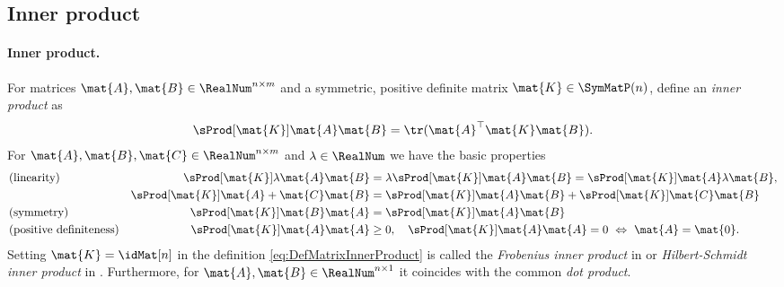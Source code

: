 \subsection{Inner product}\label{sec:MathInnerProduct}
\paragraph{Inner product.}
For matrices $\mat{A}, \mat{B} \in \RealNum^{n\times m}$ and a symmetric, positive definite matrix $ \mat{K} \in \SymMatP(n)$, define an \textit{inner product} as
\begin{align}\label{eq:DefMatrixInnerProduct}
 \sProd[\mat{K}]{\mat{A}}{\mat{B}} = \tr(\mat{A}^\top \mat{K} \mat{B}).
\end{align}
For $\mat{A}, \mat{B}, \mat{C} \in \RealNum^{n\times m}$ and $\lambda \in \RealNum$ we have the basic properties
\begin{subequations}
\begin{align}
 &\text{(linearity)}&
 \sProd[\mat{K}]{\lambda \mat{A}}{\mat{B}} &= \lambda \sProd[\mat{K}]{\mat{A}}{\mat{B}} = \sProd[\mat{K}]{\mat{A}}{\lambda \mat{B}},
\\
 &&
 \sProd[\mat{K}]{\mat{A}+\mat{C}}{\mat{B}} &= \sProd[\mat{K}]{\mat{A}}{\mat{B}} + \sProd[\mat{K}]{\mat{C}}{\mat{B}}
\\
 &\text{(symmetry)}&
 \sProd[\mat{K}]{\mat{B}}{\mat{A}} %
 &= \sProd[\mat{K}]{\mat{A}}{\mat{B}}
\\
 &\text{(positive definiteness)}&
 \sProd[\mat{K}]{\mat{A}}{\mat{A}} &\geq 0, \quad \sProd[\mat{K}]{\mat{A}}{\mat{A}} = 0 \ \Leftrightarrow \ \mat{A} = \mat{0}.
\end{align}
\end{subequations}
Setting $\mat{K} = \idMat[n]$ in the definition \eqref{eq:DefMatrixInnerProduct} is called the \textit{Frobenius inner product} in \cite[sec.\ 5.2]{Horn:MatrixAnalysis} or \textit{Hilbert-Schmidt inner product} in \cite[sec.\ A.6]{Hall:LieGroups}.
Furthermore, for $\mat{A}, \mat{B} \in \RealNum^{n\times 1}$ it coincides with the common \textit{dot product}.

